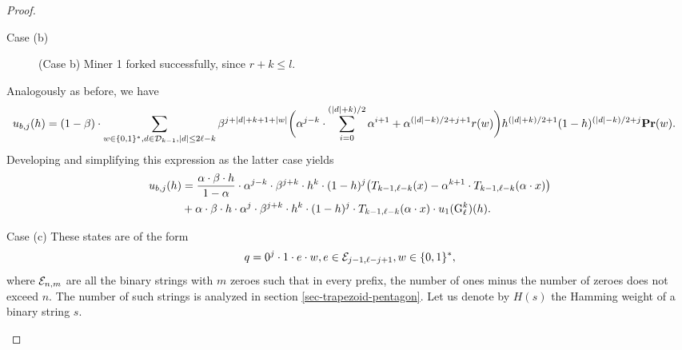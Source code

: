 \begin{proof}
\begin{subsubsection}{Case (b)}
\begin{figure}[ht!]
\caption{(Case b) Miner 1 forked successfully, since $r+k \leq l$.}

\end{figure}

Analogously as before, we have
\begin{align*}
u_{b,j}(h) &= (1-\beta) \cdot \sum_{w\in \{0,1\}^\ast, d\in \mathcal{D}_{k-1}, |d| \leq 2\ell-k}\beta^{j+|d|+k+1+|w|} \bigg(\alpha^{j-k}\cdot \sum_{i=0}^{(|d|+k)/2}\alpha^{i+1} + \alpha^{(|d|-k)/2 + j + 1} r(w)\bigg) h^{(|d|+k)/2 + 1}(1-h)^{(|d|-k)/2 + j} \mathbf{Pr}(w).
\end{align*}
Developing and simplifying this expression as the latter case yields
\begin{align*}
u_{b,j}(h) &= \frac{\alpha\cdot\beta\cdot h}{1-\alpha}\cdot \alpha^{j-k}\cdot \beta^{j+k}\cdot h^{k}\cdot (1-h)^{j}\big(T_{k-1,\ell-k}(x)-\alpha^{k+1}\cdot T_{k-1,\ell-k}(\alpha\cdot x)\big) \\
&+ \alpha\cdot\beta\cdot h\cdot \alpha^j\cdot\beta^{j+k}\cdot h^{k}\cdot(1-h)^{j}\cdot T_{k-1,\ell-k}(\alpha\cdot x)\cdot  u_1({\rm {G}}^k_\ell)(h).
\end{align*}

\end{subsubsection}


\begin{subsubsection}{Case (c)}
These states are of the form 
$$q = 0^j\cdot 1\cdot e\cdot w, e\in \mathcal{E}_{j-1,\ell-j+1}, w\in \{0,1\}^\ast,$$ 
where $\mathcal{E}_{n,m}$ are all the binary strings with $m$ zeroes such that in every prefix, the number of ones minus the number of zeroes does not exceed $n$. The number of such strings is analyzed in section \ref{sec-trapezoid-pentagon}. Let us denote by $H(s)$ the Hamming weight of a binary string $s$. 


\end{subsubsection}
\end{proof}
